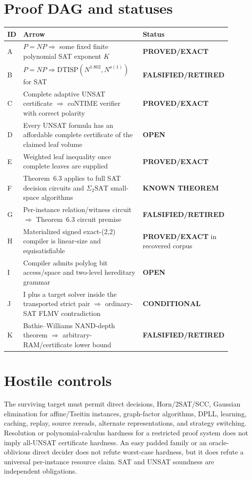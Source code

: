 \documentclass[11pt]{article}
\newcommand{\proved}{\textbf{PROVED/EXACT}}
\newcommand{\known}{\textbf{KNOWN THEOREM}}
\newcommand{\cond}{\textbf{CONDITIONAL}}
\newcommand{\openstatus}{\textbf{OPEN}}
\newcommand{\retired}{\textbf{FALSIFIED/RETIRED}}
\begin{document}
\section*{Proof DAG and statuses}
\begin{longtable}{p{0.06\linewidth}p{0.66\linewidth}p{0.19\linewidth}}
\toprule
ID & Arrow & Status\\
\midrule
A & $P=NP\Rightarrow$ some fixed finite polynomial SAT exponent $K$ & \proved\\
B & $P=NP\Rightarrow\mathrm{DTISP}(N^{1.802},N^{o(1)})$ for SAT & \retired\\
C & Complete adaptive UNSAT certificate $\Rightarrow$ coNTIME verifier with correct polarity & \proved\\
D & Every UNSAT formula has an affordable complete certificate of the claimed leaf volume & \openstatus\\
E & Weighted leaf inequality once complete leaves are supplied & \proved\\
F & Theorem~6.3 applies to full SAT decision circuits and $\Sigma_2\mathrm{SAT}$ small-space algorithms & \known\\
G & Per-instance relation/witness circuit $\Rightarrow$ Theorem~6.3 circuit premise & \retired\\
H & Materialized signed exact-(2,2) compiler is linear-size and equisatisfiable & \proved{} in recovered corpus\\
I & Compiler admits polylog bit access/space and two-level hereditary grammar & \openstatus\\
J & I plus a target solver inside the transported strict pair $\Rightarrow$ ordinary-SAT FLMV contradiction & \cond\\
K & Bathie--Williams NAND-depth theorem $\Rightarrow$ arbitrary-RAM/certificate lower bound & \retired\\
\bottomrule
\end{longtable}

\section*{Hostile controls}
The surviving target must permit direct decisions, Horn/2SAT/SCC, Gaussian elimination
for affine/Tseitin instances, graph-factor algorithms, DPLL, learning, caching, replay,
source rereads, alternate representations, and strategy switching.  Resolution or
polynomial-calculus hardness for a restricted proof system does not imply all-UNSAT
certificate hardness.  An easy padded family or an oracle-oblivious direct decider does
not refute worst-case hardness, but it does refute a universal per-instance resource
claim.  SAT and UNSAT soundness are independent obligations.
\end{document}
